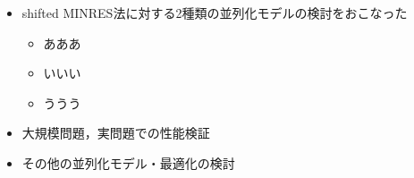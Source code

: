 

\begin{itemize}
	\item shifted MINRES法に対する2種類の並列化モデルの検討をおこなった
		\begin{itemize}
			\item あああ
			\item いいい
			\item ううう
		\end{itemize}
	\item 大規模問題，実問題での性能検証
	\item その他の並列化モデル・最適化の検討
\end{itemize}